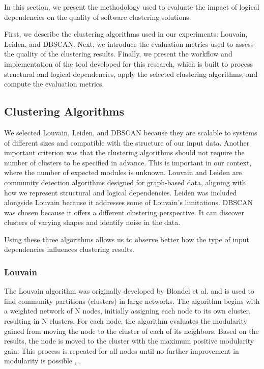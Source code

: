 \documentclass{ieeeaccess}
\begin{document}
In this section, we present the methodology used to evaluate the impact of logical dependencies on the quality of software clustering solutions.

First, we describe the clustering algorithms used in our experiments: Louvain, Leiden, and DBSCAN. Next, we introduce the evaluation metrics used to assess the quality of the clustering results. Finally, we present the workflow and implementation of the tool developed for this research, which is built to process structural and logical dependencies, apply the selected clustering algorithms, and compute the evaluation metrics.

\subsection{Clustering Algorithms}

We selected Louvain, Leiden, and DBSCAN because they are scalable to systems of different sizes and compatible with the structure of our input data. Another important criterion was that the clustering algorithms should not require the number of clusters to be specified in advance. This is important in our context, where the number of expected modules is unknown. Louvain and Leiden are community detection algorithms designed for graph-based data, aligning with how we represent structural and logical dependencies. Leiden was included alongside Louvain because it addresses some of Louvain’s limitations.
DBSCAN was chosen because it offers a different clustering perspective. It can discover clusters of varying shapes and identify noise in the data. 

Using these three algorithms allows us to observe better how the type of input dependencies influences clustering results.

\subsubsection{Louvain}
\label{subsubsec:louvain}

The Louvain algorithm was originally developed by Blondel et al. and is used to find community partitions (clusters) in large networks. The algorithm begins with a weighted network of N nodes, initially assigning each node to its own cluster, resulting in N clusters. For each node, the algorithm evaluates the modularity gained from moving the node to the cluster of each of its neighbors. Based on the results, the node is moved to the cluster with the maximum positive modularity gain. This process is repeated for all nodes until no further improvement in modularity is possible \cite{b8}, \cite{b9}.
\end{document}
